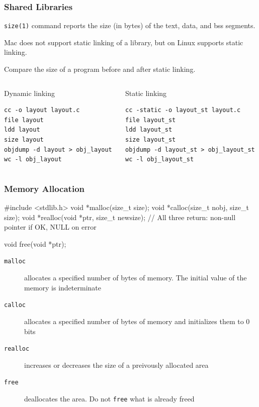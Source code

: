\documentclass[newPxFont,sthlmFooter,nooffset]{beamer}
\begin{document}
\begin{frame}[containsverbatim,t]
  \frametitle{Shared Libraries}
\texttt{size(1)} command reports the size (in bytes) of the text, data, and bss segments.

Mac does not support static linking of a library, but on Linux supports static linking. 

Compare the size of a program before and after static linking.
\bigskip
{\footnotesize
\begin{columns}
  \begin{column}{0.4\linewidth}
    Dynamic linking
\begin{verbatim}
cc -o layout layout.c
file layout
ldd layout
size layout
objdump -d layout > obj_layout
wc -l obj_layout
\end{verbatim}
  \end{column}
  \begin{column}{0.45\linewidth}
    Static linking
\begin{verbatim}
cc -static -o layout_st layout.c
file layout_st
ldd layout_st
size layout_st
objdump -d layout_st > obj_layout_st
wc -l obj_layout_st
\end{verbatim}
  \end{column}
\end{columns}
}
\end{frame}


\begin{frame}[containsverbatim,t]
  \frametitle{Memory Allocation}

\begin{codedef}
#include <stdlib.h>
void *malloc(size_t size);
void *calloc(size_t nobj, size_t size); 
void *realloc(void *ptr, size_t newsize);
// All three return: non-null pointer if OK, NULL on error

void free(void *ptr);  
\end{codedef}
\begin{description}
\item[\texttt{malloc}] allocates a specified number of bytes of memory. The initial value of the memory is indeterminate
\item[\texttt{calloc}] allocates a specified number of bytes of memory and initializes them to 0 bits
\item[\texttt{realloc}] increases or decreases the size of a preivously allocated area
\item[\texttt{free}] deallocates the area. Do not \texttt{free} what is already freed
\end{description}

\end{frame}
\end{document}
